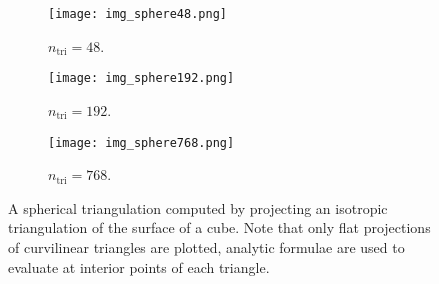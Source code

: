 \documentclass[11pt]{article}
\newcommand{\surflap}{\Delta_\Gamma}
\newcommand{\cS}{\mathcal S}
\newcommand{\cD}{\mathcal D}
\newcommand{\ntri}{n_{\text{tri}}}
\numberwithin{equation}{section}
\begin{document}
\begin{figure}[!t]
  \begin{center}
    \begin{subfigure}[b]{.3\linewidth}
      \centering
      \texttt{[image: img\_sphere48.png]}
      \caption{$\ntri = 48$.}
    \end{subfigure}
    \quad
    \begin{subfigure}[b]{.3\linewidth}
      \centering
      \texttt{[image: img\_sphere192.png]}
      \caption{$\ntri = 192$.}
    \end{subfigure}
    \quad
    \begin{subfigure}[b]{.3\linewidth}
      \centering
      \texttt{[image: img\_sphere768.png]}
      \caption{$\ntri = 768$.}
    \end{subfigure}
    \caption{A spherical triangulation computed by projecting an
      isotropic triangulation of the surface of a cube. Note that only
      flat projections of curvilinear triangles are plotted,
      analytic formulae are
    used to evaluate at interior points of each triangle.}
    \label{fig_proj}
  \end{center}
\end{figure}



\end{document}
